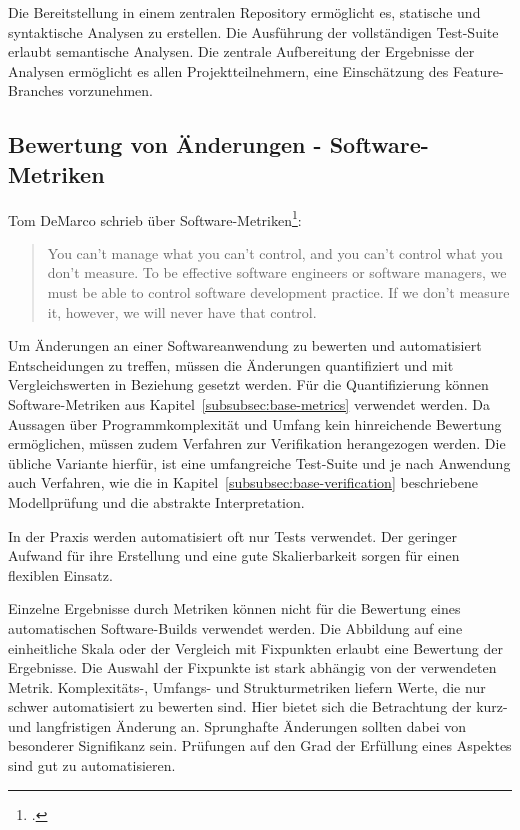 Die Bereitstellung in einem zentralen Repository ermöglicht es, statische und syntaktische Analysen zu erstellen. Die Ausführung der vollständigen Test-Suite erlaubt semantische Analysen. Die zentrale Aufbereitung der Ergebnisse der Analysen ermöglicht es allen Projektteilnehmern, eine Einschätzung des Feature-Branches vorzunehmen.

\subsection{Bewertung von Änderungen - Software-Metriken}
\label{subsec:main-metrics}

Tom DeMarco schrieb über Software-Metriken\footcite{demarco1986}:

\blockquote{You can’t manage what you can’t control, and you can’t control what you
don’t measure. To be effective software engineers or software managers, we
must be able to control software development practice. If we don’t measure
it, however, we will never have that control.}

Um Änderungen an einer Softwareanwendung zu bewerten und automatisiert Entscheidungen zu treffen, müssen die Änderungen quantifiziert und mit Vergleichswerten in Beziehung gesetzt werden. Für die Quantifizierung können Software-Metriken aus  Kapitel~\ref{subsubsec:base-metrics} verwendet werden. Da Aussagen über Programmkomplexität und Umfang kein hinreichende Bewertung ermöglichen, müssen zudem Verfahren zur Verifikation herangezogen werden. Die übliche Variante hierfür, ist eine umfangreiche Test-Suite und je nach Anwendung auch Verfahren, wie die in Kapitel~\ref{subsubsec:base-verification} beschriebene Modellprüfung und die abstrakte Interpretation.

In der Praxis werden automatisiert oft nur Tests verwendet. Der geringer Aufwand für ihre Erstellung und eine gute Skalierbarkeit sorgen für einen flexiblen Einsatz. 

Einzelne Ergebnisse durch Metriken können nicht für die Bewertung eines automatischen Software-Builds verwendet werden. Die Abbildung auf eine einheitliche Skala oder der Vergleich mit Fixpunkten erlaubt eine Bewertung der Ergebnisse. Die Auswahl der Fixpunkte ist stark abhängig von der verwendeten Metrik. Komplexitäts-, Umfangs- und Strukturmetriken liefern Werte, die nur schwer automatisiert zu bewerten sind. Hier bietet sich die Betrachtung der kurz- und langfristigen Änderung an. Sprunghafte Änderungen sollten dabei von besonderer Signifikanz sein. Prüfungen auf den Grad der Erfüllung eines Aspektes sind gut zu automatisieren. 

